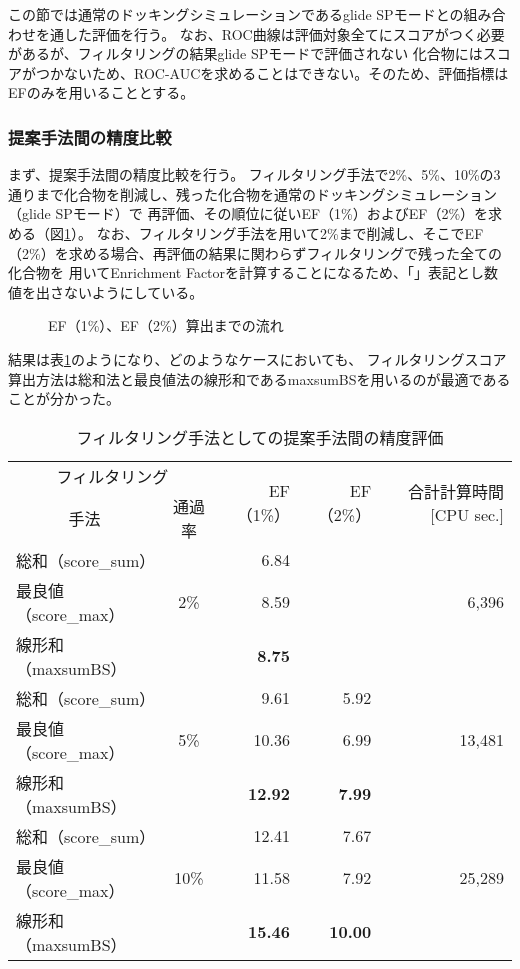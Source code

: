 この節では通常のドッキングシミュレーションであるglide SPモードとの組み合わせを通した評価を行う。
なお、ROC曲線は評価対象全てにスコアがつく必要があるが、フィルタリングの結果glide SPモードで評価されない
化合物にはスコアがつかないため、ROC-AUCを求めることはできない。そのため、評価指標はEFのみを用いることとする。

\subsubsection{提案手法間の精度比較}\label{subsubsec:filtering_proposal}
まず、提案手法間の精度比較を行う。
フィルタリング手法で2\%、5\%、10\%の3通りまで化合物を削減し、残った化合物を通常のドッキングシミュレーション（glide SPモード）で
再評価、その順位に従いEF（1\%）およびEF（2\%）を求める（図\ref{fig:filtering_image}）。
なお、フィルタリング手法を用いて2\%まで削減し、そこでEF（2\%）を求める場合、再評価の結果に関わらずフィルタリングで残った全ての化合物を
用いてEnrichment Factorを計算することになるため、「\textendash」表記とし数値を出さないようにしている。

\begin{figure}[htp]
 \begin{center}
  \caption{EF（1\%）、EF（2\%）算出までの流れ}
  \label{fig:filtering_image}
 \end{center}
\end{figure}

結果は表\ref{table:filtering_proposal}のようになり、どのようなケースにおいても、
フィルタリングスコア算出方法は総和法と最良値法の線形和であるmaxsumBSを用いるのが最適であることが分かった。

\begin{table}[htb] \centering
	\caption{フィルタリング手法としての提案手法間の精度評価}
	\label{table:filtering_proposal}
	\begin{tabular}{lc|rr|r|}
	\multicolumn{2}{c|}{フィルタリング}	&\multirow{2}{*}{EF（1\%）}	&\multirow{2}{*}{EF（2\%）}	&\multirow{2}{*}{合計計算時間 [CPU sec.]}	\\
	\multicolumn{1}{c}{手法}	&通過率	&						&						&									\\ \hline
	総和（score\_sum）		&		&6.84					&\textendash				&									\\
	最良値（score\_max）	&2\%	&8.59					&\textendash				&6,396								\\
	線形和（maxsumBS）	&		&\textbf{8.75}				&\textendash				&									\\ \hline
	総和（score\_sum）		&		&9.61					&5.92					&									\\
	最良値（score\_max）	&5\%	&10.36					&6.99					&13,481								\\
	線形和（maxsumBS）	&		&\textbf{12.92}			&\textbf{7.99}				&									\\ \hline
	総和（score\_sum）		&		&12.41					&7.67					&									\\
	最良値（score\_max）	&10\%	&11.58					&7.92					&25,289								\\
	線形和（maxsumBS）	&		&\textbf{15.46}			&\textbf{10.00}			&									\\ \hline
	\end{tabular}
\end{table}


